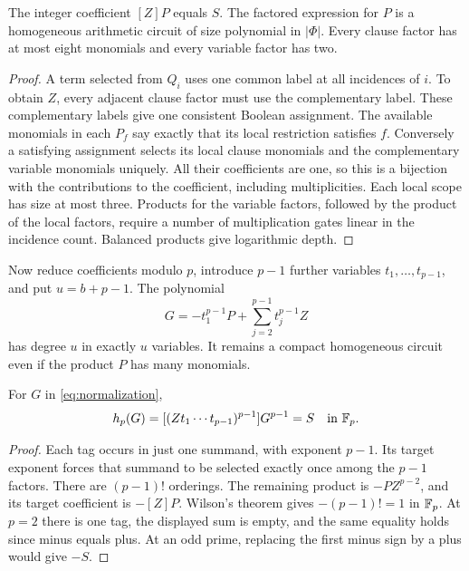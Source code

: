 \begin{lemma}\label{lem:incidence}
The integer coefficient $[Z]P$ equals $S$. The factored expression for $P$ is a homogeneous arithmetic circuit of size polynomial in $|\Phi|$. Every clause factor has at most eight monomials and every variable factor has two.
\end{lemma}
\begin{proof}
A term selected from $Q_i$ uses one common label at all incidences of $i$. To obtain $Z$, every adjacent clause factor must use the complementary label. These complementary labels give one consistent Boolean assignment. The available monomials in each $P_f$ say exactly that its local restriction satisfies $f$. Conversely a satisfying assignment selects its local clause monomials and the complementary variable monomials uniquely. All their coefficients are one, so this is a bijection with the contributions to the coefficient, including multiplicities. Each local scope has size at most three. Products for the variable factors, followed by the product of the local factors, require a number of multiplication gates linear in the incidence count. Balanced products give logarithmic depth.
\end{proof}

Now reduce coefficients modulo $p$, introduce $p-1$ further variables $t_1,\ldots,t_{p-1}$, and put $u=b+p-1$. The polynomial
\begin{equation}\label{eq:normalization}
G=-t_1^{p-1}P+\sum_{j=2}^{p-1}t_j^{p-1}Z
\end{equation}
has degree $u$ in exactly $u$ variables. It remains a compact homogeneous circuit even if the product $P$ has many monomials.

\begin{lemma}\label{lem:normalization}
For $G$ in \eqref{eq:normalization},
\[
h_p(G)=[(Zt_1\cdots t_{p-1})^{p-1}]G^{p-1}=S\quad\text{in }\mathbb F_p.
\]
\end{lemma}
\begin{proof}
Each tag occurs in just one summand, with exponent $p-1$. Its target exponent forces that summand to be selected exactly once among the $p-1$ factors. There are $(p-1)!$ orderings. The remaining product is $-PZ^{p-2}$, and its target coefficient is $-[Z]P$. Wilson's theorem gives $-(p-1)!=1$ in $\mathbb F_p$. At $p=2$ there is one tag, the displayed sum is empty, and the same equality holds since minus equals plus. At an odd prime, replacing the first minus sign by a plus would give $-S$.
\end{proof}

